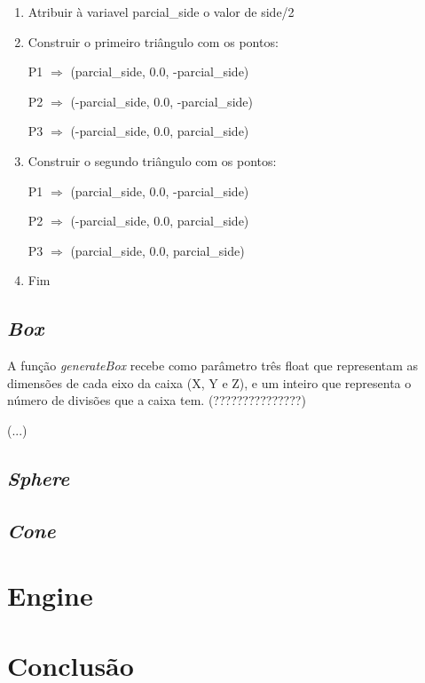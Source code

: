 \documentclass[a4paper]{article}
\begin{document}
\ttfamily
\begin{enumerate}
  \item Atribuir à variavel parcial\_side o valor de side/2
  \item Construir o primeiro triângulo com os pontos:

        \hspace{2cm} P1 $\Rightarrow$ (parcial\_side, 0.0, -parcial\_side)

        \hspace{2cm} P2 $\Rightarrow$ (-parcial\_side, 0.0, -parcial\_side)

        \hspace{2cm} P3 $\Rightarrow$ (-parcial\_side, 0.0, parcial\_side)
  \item Construir o segundo triângulo com os pontos:

        \hspace{2cm} P1 $\Rightarrow$ (parcial\_side, 0.0, -parcial\_side)

        \hspace{2cm} P2 $\Rightarrow$ (-parcial\_side, 0.0, parcial\_side)

        \hspace{2cm} P3 $\Rightarrow$ (parcial\_side, 0.0, parcial\_side)
  \item Fim
\end{enumerate}
\rmfamily


\subsection{\textit{Box}}
\label{sec:box}
A função \textit{generateBox} recebe como parâmetro três float que representam as dimensões de cada eixo da caixa (X, Y e Z), e um inteiro que representa o número de divisões que a caixa tem. (???????????????)

(...)

\subsection{\textit{Sphere}}
\label{sec:sphere}

\subsection{\textit{Cone}}
\label{sec:cone}

\section{Engine}
\label{sec:engine}

\section{Conclusão}
\label{sec:conclusao}
\end{document}
